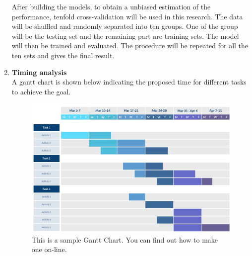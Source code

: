 \documentclass[ a4paper, 12pt, oneside ]{article} %
\begin{document}
\begin{enumerate}
\begin{itemize}
\end{itemize}
After building the models, to obtain a unbiased estimation of the performance, tenfold cross-validation will be used in this research. The data will be shuffled and randomly separated into ten groups. One of the group will be the testing set and the remaining part are training sets. The model will then be trained and evaluated. The procedure will be repeated for all the ten sets and gives the final result.\\
\item \textbf{Timing analysis}\\
A gantt chart is shown below indicating the proposed time for different tasks to achieve the goal.
\begin{figure}[h] 
\centering
\includegraphics[width=\textwidth]{SampleGanttChart.png} 
\caption{This is a sample Gantt Chart. You can find out how to make one on-line.}
\label{Fig:GanttChart}
\end{figure} 
\end{enumerate}

 
\newpage
\end{document}
